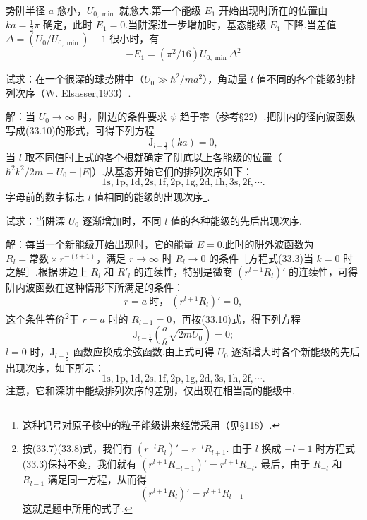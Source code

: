 \begin{xiti}
势阱半径 $a$ 愈小，$U_{0,\min}$ 就愈大.第一个能级 $E_1$ 开始出现时所在的位置由 $ka=\frac{1}{2}\pi$ 确定，此时 $E_1=0$.当阱深进一步增加时，基态能级 $E_1$ 下降.当差值 $\Delta=(U_0/U_{0,\min})-1$ 很小时，有
\begin{equation}
  -E_1=(\pi^2/16)U_{0,\min}\Delta^2
\end{equation}

\quad 试求：在一个很深的球势阱中（$U_0\gg\hbar^2/ma^2$），角动量 $l$ 值不同的各个能级的排列次序（W. Elsasser,1933）.

解：当 $U_0\to\infty$ 时，阱边的条件要求 $\psi$ 趋于零（参考§22）.把阱内的径向波函数写成(33.10)的形式，可得下列方程
\begin{equation*}
  \mathrm{J}_{l+\frac{1}{2}}(ka)=0,
\end{equation*}
当 $l$ 取不同值时上式的各个根就确定了阱底以上各能级的位置（$\hbar^2k^2/2m=U_0-|E|$）.从基态开始它们的排列次序如下：
\begin{equation*}
  1\mathrm{s},1\mathrm{p},1\mathrm{d},2\mathrm{s},1\mathrm{f},2\mathrm{p},
  1\mathrm{g},2\mathrm{d},1\mathrm{h},3\mathrm{s},2\mathrm{f},\cdots.
\end{equation*}
字母前的数字标志 $l$ 值相同的能级的出现次序\footnote{这种记号对原子核中的粒子能级讲来经常采用（见§118）.}.

\quad 试求：当阱深 $U_0$ 逐渐增加时，不同 $l$ 值的各种能级的先后出现次序.

解：每当一个新能级开始出现时，它的能量 $E=0$.此时的阱外波函数为 $R_l=\text{常数}\times r^{-(l+1)}$，满足 $r\to\infty$ 时 $R_l\to0$ 的条件［方程式(33.3)当 $k=0$ 时之解］.根据阱边上 $R_l$ 和 $R'_l$ 的连续性，特别是微商 $(r^{l+1}R_l)'$ 的连续性，可得阱内波函数在这种情形下所满足的条件：
\begin{equation*}
  r=a\ \text{时，}\ (r^{l+1}R_l)'=0,
\end{equation*}
这个条件等价\footnote{按(33.7)(33.8)式，我们有 $(r^{-l}R_l)'=r^{-l}R_{l+1}$. 由于 $l$ 换成 $-l-1$ 时方程式(33.3)保持不变，我们就有 $(r^{l+1}R_{-l-1})'=r^{l+1}R_{-l}$. 最后，由于 $R_{-l}$ 和 $R_{l-1}$ 满足同一方程，从而得
\begin{equation*}
  (r^{l+1}R_l)'=r^{l+1}R_{l-1}
\end{equation*}
这就是题中所用的式子.}于 $r=a$ 时的 $R_{l-1}=0$，再按(33.10)式，得下列方程
\begin{equation*}
  \mathrm{J}_{l-\frac{1}{2}}\left(\frac{a}{\hbar}\sqrt{2mU_0}\right)=0;
\end{equation*}
$l=0$ 时，$\mathrm{J}_{l-\frac{1}{2}}$ 函数应换成余弦函数.由上式可得 $U_0$ 逐渐增大时各个新能级的先后出现次序，如下所示：
\begin{equation*}
  1\mathrm{s},1\mathrm{p},1\mathrm{d},2\mathrm{s},1\mathrm{f},2\mathrm{p},
  1\mathrm{g},2\mathrm{d},3\mathrm{s},1\mathrm{h},2\mathrm{f},\cdots.
\end{equation*}
注意，它和深阱中能级排列次序的差别，仅出现在相当高的能级中.


\end{xiti}
